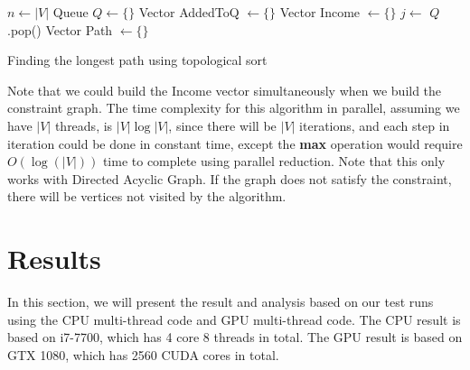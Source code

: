 \documentclass{article}
\begin{document}
\begin{algorithm}[H]
 $n\gets |V|$\;
 Queue $Q\gets \{\}$ \;
 Vector AddedToQ $\gets \{\}$\;
 Vector Income $\gets \{\}$\;
  {
     $j\gets$ $Q$.pop()\;
     Vector Path $\gets \{\}$\;
 }
 \caption{Finding the longest path using topological sort}
 \label{alg:par_topo}
\end{algorithm}

Note that we could build the Income vector simultaneously when we build the constraint graph. The time complexity for this algorithm in parallel, assuming we have $|V|$ threads, is $|V|\log|V|$, since there will be $|V|$ iterations, and each step in iteration could be done in constant time, except the \textbf{max} operation would require $O(\log(|V|))$ time to complete using parallel reduction. Note that this only works with Directed Acyclic Graph. If the graph does not satisfy the constraint, there will be vertices not visited by the algorithm.


\section{Results}
\label{sec:org75820d5}
In this section, we will present the result and analysis based on our test runs using the CPU multi-thread code and GPU multi-thread code. The CPU result is based on i7-7700, which has 4 core 8 threads in total. The GPU result is based on GTX 1080, which has 2560 CUDA cores in total.
\end{document}
